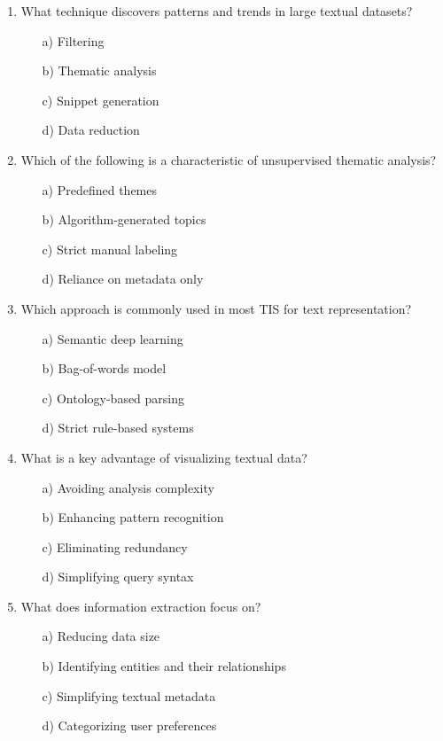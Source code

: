 \documentclass[8pt]{extarticle}
\begin{document}
\begin{multicols}{2}
\begin{enumerate}
\item What technique discovers patterns and trends in large textual datasets?
\begin{itemize}
    \item[a)] Filtering
    \item[b)] Thematic analysis
    \item[c)] Snippet generation
    \item[d)] Data reduction
\end{itemize}

\item Which of the following is a characteristic of unsupervised thematic analysis?
\begin{itemize}
    \item[a)] Predefined themes
    \item[b)] Algorithm-generated topics
    \item[c)] Strict manual labeling
    \item[d)] Reliance on metadata only
\end{itemize}

\item Which approach is commonly used in most TIS for text representation?
\begin{itemize}
    \item[a)] Semantic deep learning
    \item[b)] Bag-of-words model
    \item[c)] Ontology-based parsing
    \item[d)] Strict rule-based systems
\end{itemize}

\item What is a key advantage of visualizing textual data?
\begin{itemize}
    \item[a)] Avoiding analysis complexity
    \item[b)] Enhancing pattern recognition
    \item[c)] Eliminating redundancy
    \item[d)] Simplifying query syntax
\end{itemize}

\item What does information extraction focus on?
\begin{itemize}
    \item[a)] Reducing data size
    \item[b)] Identifying entities and their relationships
    \item[c)] Simplifying textual metadata
    \item[d)] Categorizing user preferences
\end{itemize}


\end{enumerate}
\end{multicols}
\end{document}
